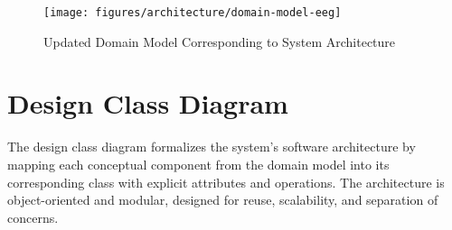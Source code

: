 \begin{figure}[h!]
    \centering
    \texttt{[image: figures/architecture/domain-model-eeg]}
    \caption{Updated Domain Model Corresponding to System Architecture}
    \label{fig:figure9}
\end{figure}

\newpageafter


\section{Design Class Diagram}
\label{sec:design-class-diagram}

The design class diagram formalizes the system's software architecture by mapping each conceptual component from the domain model into its corresponding class with explicit attributes and operations. The architecture is object-oriented and modular, designed for reuse, scalability, and separation of concerns.

